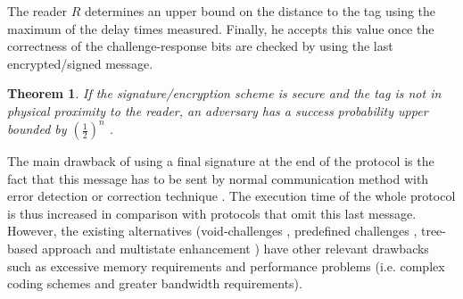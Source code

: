 \documentclass{article}
\newtheorem{theorem}{Theorem}\newtheorem{proposition}[theorem]{Proposition}
\begin{document}
The reader $R$ determines an upper bound on the distance to the tag using the maximum of the delay times measured.  Finally, he accepts this value once the correctness of the challenge-response bits are checked by using the last encrypted/signed message.

\begin{theorem}\label{th::mafiafraud}
If the signature/encryption scheme is secure and the tag is not in physical proximity to the reader, an adversary has a success probability upper bounded by $(\frac{1}{2})^n$ \cite{KimAKSP-2008-icisc,brands94}.
\end{theorem}


The main drawback of using a final signature at the end of the protocol is the fact that this message has to be sent by normal communication method with error detection or correction technique \cite{KimA-2009-cans}. The execution time of the whole protocol is thus increased in comparison with protocols that omit this last message.   However, the existing alternatives (void-challenges \cite{munilla2}, predefined challenges \cite{KimA-2009-cans}, tree-based approach \cite{AvoineT-2009-isc} and multistate enhancement \cite{AvoineFM-2009-indocrypt}) have other relevant drawbacks such as excessive memory requirements and performance problems (i.e. complex coding schemes and greater bandwidth requirements).
\end{document}
